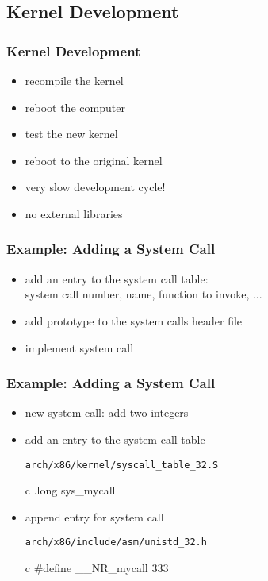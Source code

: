 \documentclass[dvipsnames]{beamer}
\begin{document}
\subsection{Kernel Development}

\begin{frame}
  \frametitle{Kernel Development}

  \begin{itemize}
    \item recompile the kernel
    \item reboot the computer
    \item test the new kernel
    \item reboot to the original kernel

    \bigskip
    \item very slow development cycle!
    \item no external libraries
  \end{itemize}
\end{frame}

\begin{frame}
  \frametitle{Example: Adding a System Call}

  \begin{itemize}
    \item add an entry to the system call table:\\
      system call number, name, function to invoke, ...
    \item add prototype to the system calls header file
    \item implement system call
  \end{itemize}
\end{frame}

\begin{frame}[fragile]
  \frametitle{Example: Adding a System Call}

  \begin{itemize}
    \item new system call: add two integers

    \pause
    \medskip
    \item add an entry to the system call table
    \begin{exampleblock}{\texttt{arch/x86/kernel/syscall\_table\_32.S}}
      \begin{pygments}{c}
.long sys_mycall
      \end{pygments}
    \end{exampleblock}

    \pause
    \medskip
    \item append entry for system call
    \begin{exampleblock}{\texttt{arch/x86/include/asm/unistd\_32.h}}
      \begin{pygments}{c}
#define __NR_mycall 333
      \end{pygments}
    \end{exampleblock}
  \end{itemize}
\end{frame}
\end{document}
